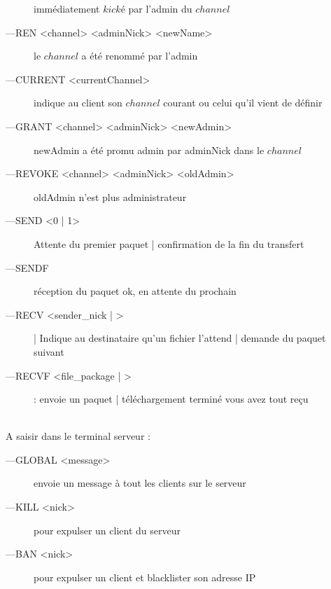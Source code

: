 \documentclass[12pt]{article}
\begin{document}
\begin{description}
    immédiatement $kické$ par l'admin du $channel$
    \item[---REN <channel> <adminNick> <newName>]  le $channel$ a été renommé par l'admin
    \item[---CURRENT <currentChannel>]  indique au client son $channel$ courant ou celui qu'il vient de définir
    \item[---GRANT <channel> <adminNick> <newAdmin>]  newAdmin a été promu admin par adminNick dans le $channel$
    \item[---REVOKE <channel> <adminNick> <oldAdmin>]  oldAdmin n'est plus administrateur
    \item[---SEND <0 | 1>]  Attente du premier paquet | confirmation de la fin du transfert
    \item[---SENDF]  réception du paquet ok, en attente du prochain
    \item[---RECV <sender\_nick | >] | Indique au destinataire qu'un fichier l'attend | demande du paquet suivant
    \item[---RECVF <file\_package | >] :  envoie un paquet | téléchargement terminé vous avez tout reçu
    \\
\end{description}

\\A saisir dans le terminal serveur : 
\begin{description}
    \item[---GLOBAL <message>]  envoie un message à tout les clients sur le serveur
    \item[---KILL <nick>]  pour expulser un client du serveur
    \item[---BAN <nick>]  pour expulser un client et blacklister son adresse IP
    \\
\end{description}


\end{document}
